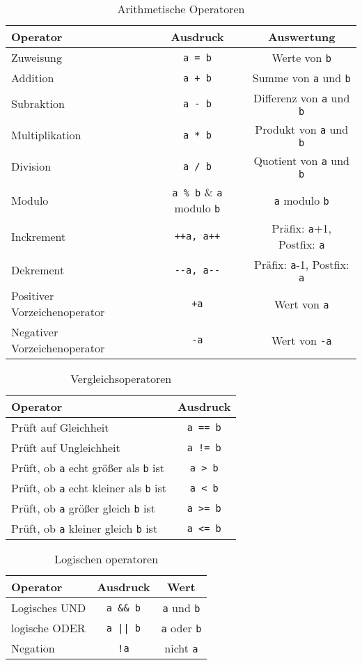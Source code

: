 \begin{table}
  \centering
  \begin{tabular}{l c c}
    \hline
    Operator & Ausdruck & Auswertung \\
    \hline
    Zuweisung & \verb|a = b| & Werte von \verb|b| \\
    Addition & \verb|a + b| & Summe von \verb|a| und \verb|b| \\
    Subraktion & \verb|a - b| & Differenz von \verb|a| und \verb|b| \\
    Multiplikation & \verb|a * b| & Produkt von \verb|a| und \verb|b| \\
    Division & \verb|a / b| & Quotient von \verb|a| und \verb|b| \\
    Modulo & \verb|a % b| & \verb|a| modulo \verb|b| \\
    Inckrement & \verb|++a, a++| & Präfix: \verb|a|+1, Postfix: \verb|a| \\
    Dekrement & \verb|--a, a--| & Präfix: \verb|a|-1, Postfix: \verb|a| \\
    Positiver Vorzeichenoperator & \verb|+a| & Wert von \verb|a| \\
    Negativer Vorzeichenoperator & \verb|-a| & Wert von \verb|-a|  \\
    \hline
  \end{tabular}
  \caption{Arithmetische Operatoren \label{oper}}
\end{table}

\begin{table}
  \centering
  \begin{tabular}{l c}
    \hline
    Operator & Ausdruck \\
    \hline
    Prüft auf Gleichheit & \verb|a == b|  \\
    Prüft auf Ungleichheit & \verb|a != b| \\
    Prüft, ob \verb|a| echt größer als \verb|b| ist & \verb|a > b| \\
    Prüft, ob \verb|a| echt kleiner als \verb|b| ist & \verb|a < b| \\
    Prüft, ob \verb|a| größer gleich \verb|b| ist & \verb|a >= b| \\
    Prüft, ob \verb|a| kleiner gleich \verb|b| ist & \verb|a <= b| \\
    \hline
  \end{tabular}
  \caption{Vergleichsoperatoren \label{vergoper}}
\end{table}

\begin{table}
  \centering
  \begin{tabular}{l c c}
    \hline
    Operator & Ausdruck & Wert \\
    \hline
    Logisches UND & \verb|a && b|  &   \verb|a| und \verb|b| \\

    logische ODER & \verb'a || b'  &   \verb|a| oder \verb|b| \\

    Negation      & \verb|!a|      &   nicht \verb|a| \\
    \hline
  \end{tabular}
  \caption{Logischen operatoren \label{vergoper2}}
\end{table}

